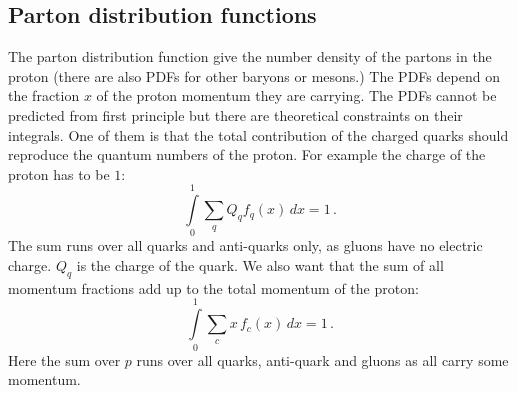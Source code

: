 \documentclass[12pt]{article}
\begin{document}
\subsection{Parton distribution functions}\label{sec:pdf}
The parton distribution function give the number density of the partons in the proton (there are also PDFs for other baryons or mesons.) The PDFs depend on the fraction $x$ of the proton momentum they are carrying. The PDFs cannot be predicted from first principle but there are theoretical constraints on their integrals. One of them is that the total contribution of the charged quarks should reproduce the quantum numbers of the proton. For example the charge of the proton has to be $1$:
\[\int\limits_0^1\sum\limits_{q}Q_qf_q(x)\,dx=1\,.\]
The sum runs over all quarks and anti-quarks only, as gluons have no electric charge. $Q_q$ is the charge of the quark. 
We also want that the sum of all momentum fractions add up to the total momentum of the proton:
\[\int\limits_0^1\sum\limits_{c} x\,f_c(x)\,dx=1\,.\]
Here the sum over $p$ runs over all quarks, anti-quark and gluons as all carry some momentum. 
\end{document}
